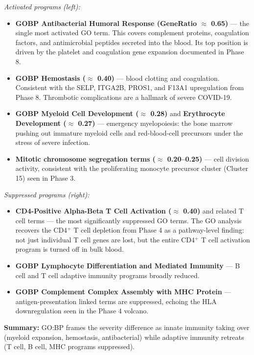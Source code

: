 \documentclass[11pt, a4paper]{article}
\begin{document}
\textit{Activated programs (left):}
\begin{itemize}[nosep]
  \item \textbf{GOBP Antibacterial Humoral Response (GeneRatio $\approx$ 0.65)} —
        the single most activated GO term. This covers complement proteins, coagulation
        factors, and antimicrobial peptides secreted into the blood.
        Its top position is driven by the platelet and coagulation gene expansion
        documented in Phase 8.
  \item \textbf{GOBP Hemostasis ($\approx$ 0.40)} — blood clotting and coagulation.
        Consistent with the SELP, ITGA2B, PROS1, and F13A1 upregulation from Phase 8.
        Thrombotic complications are a hallmark of severe COVID-19.
  \item \textbf{GOBP Myeloid Cell Development ($\approx$ 0.28)} and
        \textbf{Erythrocyte Development ($\approx$ 0.27)} — emergency myelopoiesis:
        the bone marrow pushing out immature myeloid cells and red-blood-cell precursors
        under the stress of severe infection.
  \item \textbf{Mitotic chromosome segregation terms ($\approx$ 0.20--0.25)} —
        cell division activity, consistent with the proliferating monocyte
        precursor cluster (Cluster 15) seen in Phase 3.
\end{itemize}

\textit{Suppressed programs (right):}
\begin{itemize}[nosep]
  \item \textbf{CD4-Positive Alpha-Beta T Cell Activation ($\approx$ 0.40)} and
        related T cell terms — the most significantly suppressed GO terms.
        The GO analysis recovers the CD4$^+$ T cell depletion from Phase 4 as a
        pathway-level finding: not just individual T cell genes are lost, but the
        entire CD4$^+$ T cell activation program is turned off in bulk blood.
  \item \textbf{GOBP Lymphocyte Differentiation and Mediated Immunity} —
        B cell and T cell adaptive immunity programs broadly reduced.
  \item \textbf{GOBP Complement Complex Assembly with MHC Protein} —
        antigen-presentation linked terms are suppressed, echoing the
        HLA downregulation seen in the Phase 4 volcano.
\end{itemize}

\textbf{Summary:} GO:BP frames the severity difference as innate immunity
taking over (myeloid expansion, hemostasis, antibacterial) while adaptive
immunity retreats (T cell, B cell, MHC programs suppressed).
\end{document}
